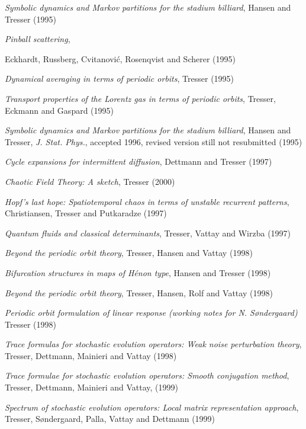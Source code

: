 {
{\em Symbolic dynamics and {Markov} partitions for the stadium billiard},
{Hansen and Tresser}
{(1995)}

{\em Pinball scattering},
{Eckhardt, Russberg, Cvitanovi{\'c, Rosenqvist and Scherer}
{(1995)}

{\em Dynamical averaging in terms of periodic orbits},
{Tresser}
{(1995)}

{\em Transport properties of the {Lorentz} gas in terms of periodic orbits},
{Tresser, Eckmann and Gaspard}
{(1995)}

{\em Symbolic dynamics and {Markov} partitions for the stadium billiard},
{Hansen and Tresser},
{{\em J. Stat. Phys.}, accepted 1996, revised version still not resubmitted}
{(1995)}

{\em Cycle expansions for intermittent diffusion},
 {Dettmann and Tresser}
{(1997)}

{\em {Chaotic Field Theory}: {A} sketch},
{Tresser}
{(2000)}

{\em Hopf's last hope: {Spatiotemporal} chaos in terms of unstable
recurrent patterns},
{Christiansen, Tresser and Putkaradze}
{(1997)}

{\em Quantum fluids and classical determinants},
{Tresser, Vattay and Wirzba}
{(1997)}

{\em Beyond the periodic orbit theory},
{Tresser, Hansen and Vattay}
{(1998)}

{\em Bifurcation structures in maps of {H\'enon} type},
{Hansen and Tresser}
{(1998)}

{\em Beyond the periodic orbit theory},
{Tresser, Hansen, Rolf  and Vattay}
{(1998)}

{\em Periodic orbit formulation of linear response (working notes for {N.
S{\o}ndergaard})}
{Tresser}
{(1998)}

 {\em Trace formulas for stochastic evolution operators:
{Weak} noise perturbation theory},
{Tresser, Dettmann, Mainieri and Vattay}
{(1998)}

{\em Trace formulae for stochastic evolution operators: {Smooth}
conjugation method},
{Tresser, Dettmann, Mainieri and Vattay},
{(1999)}

{\em Spectrum of stochastic evolution operators: {Local} matrix
representation approach},
{Tresser, S{\o}ndergaard, Palla, Vattay and Dettmann}
{(1999)}

}}
